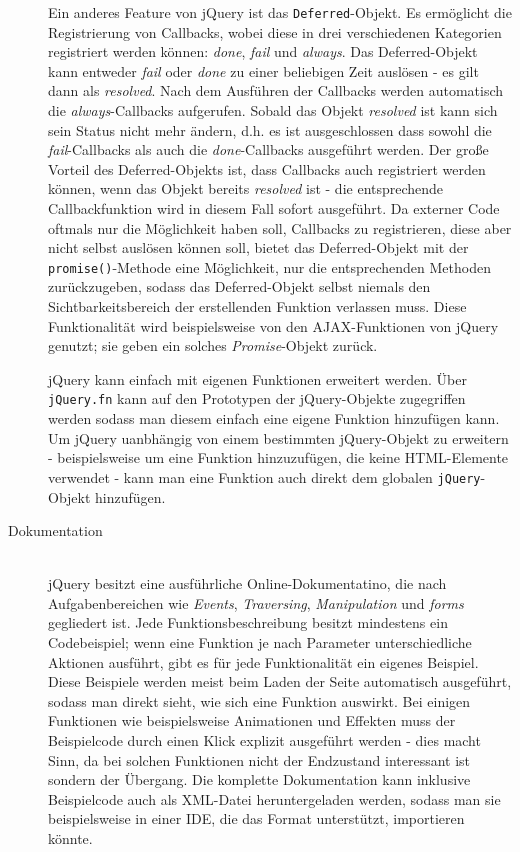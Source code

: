 \begin{description}
Ein anderes Feature von jQuery ist das \lstinline{Deferred}-Objekt. Es ermöglicht die Registrierung
von Callbacks, wobei diese in drei verschiedenen Kategorien registriert werden können: \emph{done},
\emph{fail} und \emph{always}. Das Deferred-Objekt kann entweder \emph{fail} oder \emph{done} zu
einer beliebigen Zeit auslösen - es gilt dann als \emph{resolved}. Nach dem Ausführen der Callbacks
werden automatisch die \emph{always}-Callbacks aufgerufen. Sobald das Objekt \emph{resolved} ist
kann sich sein Status nicht mehr ändern, d.h. es ist ausgeschlossen dass sowohl die
\emph{fail}-Callbacks als auch die \emph{done}-Callbacks ausgeführt werden. Der große Vorteil des
Deferred-Objekts ist, dass Callbacks auch registriert werden können, wenn das Objekt bereits
\emph{resolved} ist - die entsprechende Callbackfunktion wird in diesem Fall sofort ausgeführt.
Da externer Code oftmals nur die Möglichkeit haben soll, Callbacks zu registrieren, diese aber nicht
selbst auslösen können soll, bietet das Deferred-Objekt mit der \lstinline{promise()}-Methode eine
Möglichkeit, nur die entsprechenden Methoden zurückzugeben, sodass das Deferred-Objekt selbst
niemals den Sichtbarkeitsbereich der erstellenden Funktion verlassen muss. Diese Funktionalität wird
beispielsweise von den AJAX-Funktionen von jQuery genutzt; sie geben ein solches
\emph{Promise}-Objekt zurück.

jQuery kann einfach mit eigenen Funktionen erweitert werden. Über \lstinline{jQuery.fn} kann auf den
Prototypen der jQuery-Objekte zugegriffen werden sodass man diesem einfach eine eigene Funktion
hinzufügen kann. Um jQuery uanbhängig von einem bestimmten jQuery-Objekt zu erweitern -
beispielsweise um eine Funktion hinzuzufügen, die keine HTML-Elemente verwendet - kann man eine
Funktion auch direkt dem globalen \lstinline{jQuery}-Objekt hinzufügen.

\item[Dokumentation] \hfill \\
jQuery besitzt eine ausführliche Online-Dokumentatino, die nach Aufgabenbereichen wie
\emph{Events}, \emph{Traversing}, \emph{Manipulation} und \emph{forms} gegliedert ist. Jede
Funktionsbeschreibung besitzt mindestens ein Codebeispiel; wenn eine Funktion je nach Parameter
unterschiedliche Aktionen ausführt, gibt es für jede Funktionalität ein eigenes Beispiel. Diese
Beispiele werden meist beim Laden der Seite automatisch ausgeführt, sodass man direkt sieht, wie
sich eine Funktion auswirkt. Bei einigen Funktionen wie beispielsweise Animationen und Effekten muss
der Beispielcode durch einen Klick explizit ausgeführt werden - dies macht Sinn, da bei solchen
Funktionen nicht der Endzustand interessant ist sondern der Übergang. Die komplette Dokumentation
kann inklusive Beispielcode auch als XML-Datei heruntergeladen werden, sodass man sie beispielsweise
in einer IDE, die das Format unterstützt, importieren könnte.


\end{description}
